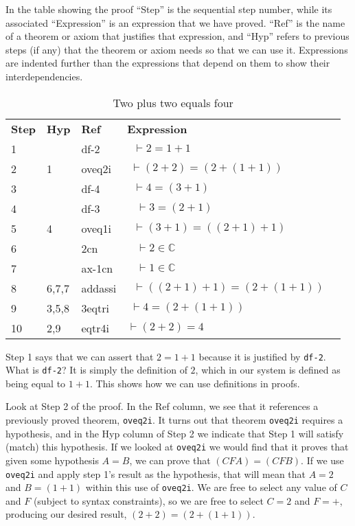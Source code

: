 In the table showing the proof ``Step'' is the sequential step number,
while its associated ``Expression'' is an expression that we have proved.
``Ref'' is the name of a theorem or axiom that justifies that expression,
and ``Hyp'' refers to previous steps (if any) that the theorem or axiom
needs so that we can use it.  Expressions are indented further than
the expressions that depend on them to show their interdependencies.

\begin{table}[!htbp]
\caption{Two plus two equals four}
\begin{tabular}{lllll}
\textbf{Step} & \textbf{Hyp} & \textbf{Ref} & \textbf{Expression} & \\
1  &       & df-2    & $ \; \; \vdash 2 = 1 + 1$  & \\
2  & 1     & oveq2i  & $ \; \vdash (2 + 2) = (2 + (1 + 1))$ & \\
3  &       & df-4    & $ \; \; \vdash 4 = (3 + 1)$ & \\
4  &       & df-3    & $ \; \; \; \vdash 3 = (2 + 1)$ & \\
5  & 4     & oveq1i  & $ \; \; \vdash (3 + 1) = ((2 + 1) + 1)$ & \\
6  &       & 2cn     & $ \; \; \; \vdash 2 \in \mathbb{C}$ & \\
7  &       & ax-1cn  & $ \; \; \; \vdash 1 \in \mathbb{C}$ & \\
8  & 6,7,7 & addassi & $ \; \; \vdash ((2 + 1) + 1) = (2 + (1 + 1))$ & \\
9  & 3,5,8 & 3eqtri  & $ \; \vdash 4 = (2 + (1 + 1))$ & \\
10 & 2,9   & eqtr4i  & $ \vdash (2 + 2) = 4$ & \\
\end{tabular}
\end{table}

Step 1 says that we can assert that $2 = 1 + 1$ because it is
justified by \texttt{df-2}.
What is \texttt{df-2}?
It is simply the definition of $2$, which in our system is defined as being
equal to $1 + 1$.  This shows how we can use definitions in proofs.

Look at Step 2 of the proof. In the Ref column, we see that it references
a previously proved theorem, \texttt{oveq2i}.
It turns out that
theorem \texttt{oveq2i} requires a
hypothesis, and in the Hyp column of Step 2 we indicate that Step 1 will
satisfy (match) this hypothesis.
If we looked at \texttt{oveq2i}
we would find that it proves that given some hypothesis
$A = B$, we can prove that $( C F A ) = ( C F B )$.
If we use \texttt{oveq2i} and apply step 1's result as the hypothesis,
that will mean that $A = 2$ and $B = ( 1 + 1 )$ within this use of
\texttt{oveq2i}.
We are free to select any value of $C$ and $F$ (subject to syntax constraints),
so we are free to select $C = 2$ and $F = +$,
producing our desired result,
$ (2 + 2) = (2 + (1 + 1))$.

